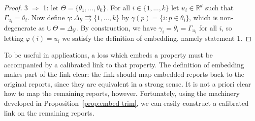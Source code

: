 \documentclass[anon,12pt]{colt2019}
\newcommand{\reals}{\mathbb{R}}
\newcommand{\simplex}{\Delta_\Y}
\newcommand{\R}{\mathcal{R}}
\newcommand{\Y}{\mathcal{Y}}
\newcommand{\toto}{\rightrightarrows}
\newcommand{\trim}{\mathrm{trim}}
\DeclareMathOperator*{\argmin}{arg\,min}
\begin{document}
\begin{proof}


  3 $\Rightarrow$ 1: let $\Theta = \{\theta_1,\ldots,\theta_k\}$.
  For all $i\in\{1,\ldots,k\}$ let $u_i\in\reals^d$ such that $\Gamma_{u_i} = \theta_i$.
  Now define $\gamma:\simplex\toto\{1,\ldots,k\}$ by $\gamma(p) = \{i : p\in\theta_i\}$, which is non-degenerate as $\cup\,\Theta = \simplex$.
  By construction, we have $\gamma_i = \theta_i = \Gamma_{u_i}$ for all $i$, so letting $\varphi(i) = u_i$ we satisfy the definition of embedding, namely statement 1.
\end{proof}

To be useful in applications, a loss which embeds a property must be accompanied by a calibrated link to that property.
The definition of embedding makes part of the link clear: the link should map embedded reports back to the original reports, since they are equivalent in a strong sense.
It is not a priori clear how to map the remaining reports, however.
Fortunately, using the machinery developed in Proposition~\ref{prop:embed-trim}, we can easily construct a calibrated link on the remaining reports.
\end{document}
